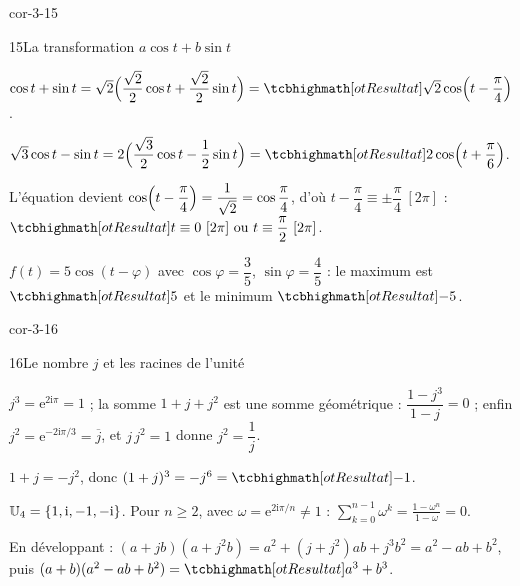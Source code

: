 \begin{blocLivre}{cor-3-15}
\begin{corrige}{15}{La transformation $a\cos t+b\sin t$}
\begin{questions}
  \item $\cos t+\sin t=\sqrt2\Bigl(\dfrac{\sqrt2}{2}\cos t+\dfrac{\sqrt2}{2}\sin t\Bigr)
    =\res{\sqrt2\cos\Bigl(t-\dfrac{\pi}{4}\Bigr)}$.
  \item $\sqrt3\cos t-\sin t=2\Bigl(\dfrac{\sqrt3}{2}\cos t-\dfrac12\sin t\Bigr)
    =\res{2\cos\Bigl(t+\dfrac{\pi}{6}\Bigr)}$.
  \item L'équation devient $\cos\Bigl(t-\dfrac{\pi}{4}\Bigr)=\dfrac{1}{\sqrt2}
    =\cos\dfrac{\pi}{4}$, d'où $t-\dfrac{\pi}{4}\equiv\pm\dfrac{\pi}{4}\ [2\pi]$ :
    $\res{t\equiv0\ [2\pi]\ \text{ou}\ t\equiv\dfrac{\pi}{2}\ [2\pi]}$.
  \item $f(t)=5\cos(t-\varphi)$ avec $\cos\varphi=\dfrac35$,
    $\sin\varphi=\dfrac45$ : le maximum est $\res{5}$ et le minimum $\res{-5}$.
\end{questions}
\end{corrige}
\end{blocLivre}

\begin{blocLivre}{cor-3-16}
\begin{corrige}{16}{Le nombre $j$ et les racines de l'unité}
\begin{questions}
  \item $j^{3}=\mathrm{e}^{2\mathrm{i}\pi}=1$ ; la somme $1+j+j^{2}$ est une somme
    géométrique : $\dfrac{1-j^{3}}{1-j}=0$ ; enfin
    $j^{2}=\mathrm{e}^{-2\mathrm{i}\pi/3}=\overline{j}$, et $j\,j^{2}=1$ donne
    $j^{2}=\dfrac1j$.
  \item $1+j=-j^{2}$, donc $(1+j)^{3}=-j^{6}=\res{-1}$.
  \item $\mathbb{U}_4=\left\{1,\mathrm{i},-1,-\mathrm{i}\right\}$. Pour $n\geq2$, avec
    $\omega=\mathrm{e}^{2\mathrm{i}\pi/n}\neq1$ :
    $\displaystyle\sum_{k=0}^{n-1}\omega^{k}=\frac{1-\omega^{n}}{1-\omega}=0$.
  \item En développant :
    $(a+jb)(a+j^{2}b)=a^{2}+(j+j^{2})ab+j^{3}b^{2}=a^{2}-ab+b^{2}$, puis
    $(a+b)(a^{2}-ab+b^{2})=\res{a^{3}+b^{3}}$.
\end{questions}
\end{corrige}
\end{blocLivre}


